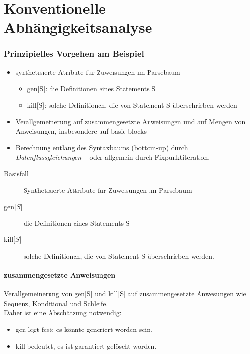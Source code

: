 \section{Konventionelle Abhängigkeitsanalyse} %
\label{sec:konventionelle_abhaengigkeitsanalyse}
\subsubsection{Prinzipielles Vorgehen am Beispiel} %
\label{ssub:prinzipielles_vorgehen_am_beispiel}

\begin{itemize}
    \item synthetisierte Atribute für Zuweisungen im Parsebaum
    \begin{itemize}
        \item gen[S]: die Definitionen eines Statements S
        \item kill[S]: solche Definitionen, die von Statement S überschrieben werden
    \end{itemize}
    \item Verallgemeinerung auf zusammengesetzte Anweisungen und auf Mengen von Anweisungen, insbesondere auf \glqq basic blocks\grqq
    \item Berechnung entlang des Syntaxbaums (bottom-up) durch \emph{Datenflussgleichungen} -- oder allgemein durch Fixpunktiteration.
\end{itemize}


\begin{description}
\item[Basisfall] Synthetisierte Attribute für Zuweisungen im Parsebaum
\item[gen$\lbrack S \rbrack$] die Definitionen eines Statements S
\item[kill$\lbrack S \rbrack$] solche Definitionen, die von Statement S überschrieben werden.
\end{description}


\paragraph{zusammengesetzte Anweisungen} %
\label{par:zusammengesetzte_anweisungen}
Verallgemeinerung von gen[S] und kill[S] auf zusammengesetzte Anwesungen wie Sequenz, Konditional und Schleife.\\
Daher ist eine Abschätzung notwendig:
\begin{itemize}
    \item gen legt fest: es könnte generiert worden sein.
    \item kill bedeutet, es ist garantiert gelöscht worden.
\end{itemize}


